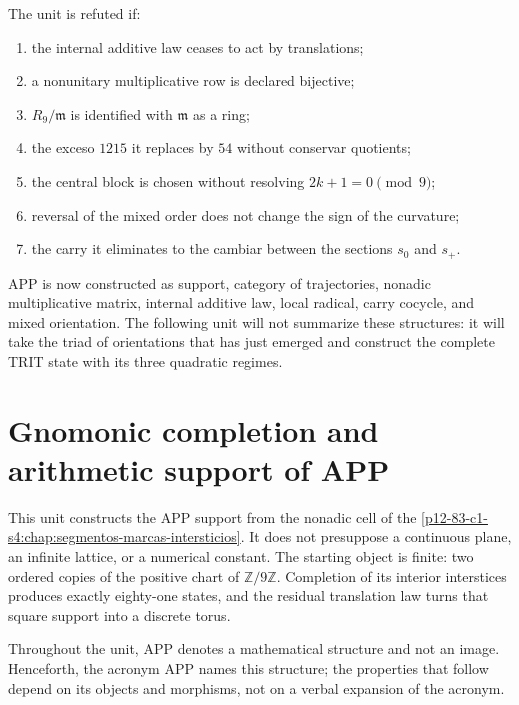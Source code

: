 \begin{criterion}
The unit is refuted if:
\begin{enumerate}
 \item the internal additive law ceases to act by translations;
 \item a nonunitary multiplicative row is declared bijective;
 \item \(R_9/\mathfrak m\) is identified with \(\mathfrak m\) as a ring;
 \item the exceso \(1215\) it replaces by \(54\) without conservar quotients;
 \item the central block is chosen without resolving \(2k+1=0\pmod9\);
 \item reversal of the mixed order does not change the sign of the curvature;
 \item the carry it eliminates to the cambiar between the sections \(s_0\) and
       \(s_+\).
\end{enumerate}
\end{criterion}

APP is now constructed as support, category of trajectories, nonadic
multiplicative matrix, internal additive law, local radical, carry cocycle,
and mixed orientation. The following unit
will not summarize these structures: it will take the triad of orientations
that has just emerged and construct the complete TRIT state with its three
quadratic regimes.



\section{Gnomonic completion and arithmetic support of APP}
\label{p12-83-c1-s2:chap:app-completacion-gnomonica}

This unit constructs the APP support from the
nonadic cell of the \cref{p12-83-c1-s4:chap:segmentos-marcas-intersticios}. It does not presuppose a
continuous plane, an infinite lattice, or a numerical constant. The starting
object is finite: two ordered copies of the positive chart of
\(\mathbb Z/9\mathbb Z\). Completion of its interior interstices
produces exactly eighty-one states, and the residual translation law
turns that square support into a discrete torus.

Throughout the unit, APP denotes a mathematical structure and not an image.
Henceforth, the acronym APP names this structure; the properties that
follow depend on its objects and morphisms, not on a verbal expansion of the
acronym.


